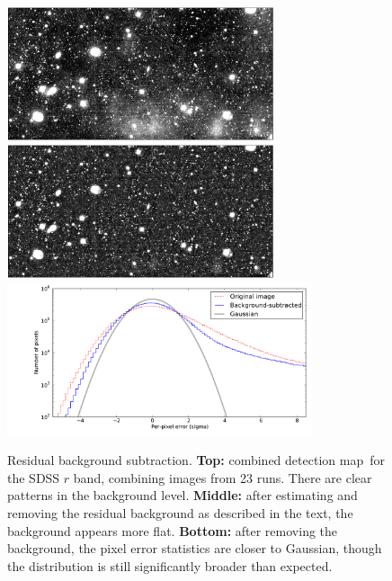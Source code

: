 \documentclass[letterpaper,preprint]{aastex}
\newcommand{\detmap}{detection map}
\begin{document}
\begin{figure}
\begin{center}
\includegraphics[width=0.7\textwidth]{detect-r-00} \\
\includegraphics[width=0.7\textwidth]{detect-r-01} \\
\includegraphics[width=0.8\textwidth]{detect-r-02}
\caption{Residual background subtraction.  \textbf{Top:} combined
  \detmap\ for the SDSS $r$ band, combining images from 23 runs.
  There are clear patterns in the background level.  \textbf{Middle:}
  after estimating and removing the residual background as described
  in the text, the background appears more flat.  \textbf{Bottom:}
  after removing the background, the pixel error statistics are closer
  to Gaussian, though the distribution is still significantly
  broader than expected.\label{fig:bg}}
\end{center}
\end{figure}
\end{document}
